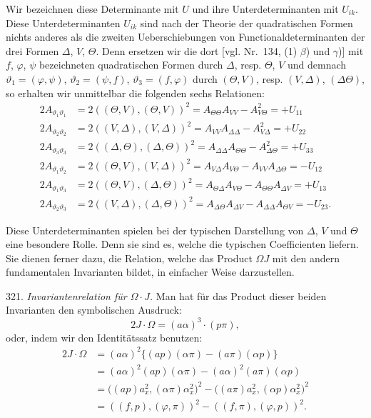 \documentclass[11pt]{article}
\providecommand{\weberpage}[1]{}
\let\Delta\varDelta
\let\Theta\varTheta
\let\Omega\varOmega
\begin{document}
Wir bezeichnen diese Determinante mit $U$ und ihre Unterdeterminanten mit
$U_{ik}$. Diese Unterdeterminanten $U_{ik}$ sind nach der Theorie der
quadratischen Formen nichts anderes als die zweiten Ueberschiebungen von
Functionaldeterminanten der drei Formen $\Delta$, $V$, $\Theta$. Denn
ersetzen wir die dort [vgl. Nr.\ 134, (1) $\beta$) und $\gamma$)] mit
$f$, $\varphi$, $\psi$ bezeichneten quadratischen Formen durch $\Delta$,
resp. $\Theta$, $V$ und demnach $\vartheta_1 = (\varphi,\psi)$,
$\vartheta_2 = (\psi,f)$, $\vartheta_3 = (f,\varphi)$ durch $(\Theta,V)$,
resp. $(V,\Delta)$, $(\Delta\Theta)$, so erhalten wir unmittelbar die
folgenden sechs Relationen:
\[
\begin{aligned}
2A_{\vartheta_1\vartheta_1} &= 2((\Theta,V),(\Theta,V))^2 = A_{\Theta\Theta}A_{VV} - A_{V\Theta}^2 = +U_{11}\\
2A_{\vartheta_2\vartheta_2} &= 2((V,\Delta),(V,\Delta))^2 = A_{VV}A_{\Delta\Delta} - A_{V\Delta}^2 = +U_{22}\\
2A_{\vartheta_3\vartheta_3} &= 2((\Delta,\Theta),(\Delta,\Theta))^2 = A_{\Delta\Delta}A_{\Theta\Theta} - A_{\Delta\Theta}^2 = +U_{33}\\
2A_{\vartheta_1\vartheta_2} &= 2((\Theta,V),(V,\Delta))^2 = A_{V\Delta}A_{V\Theta} - A_{VV}A_{\Delta\Theta} = -U_{12}\\
2A_{\vartheta_1\vartheta_3} &= 2((\Theta,V),(\Delta,\Theta))^2 = A_{\Theta\Delta}A_{V\Theta} - A_{\Theta\Theta}A_{\Delta V} = +U_{13}\\
2A_{\vartheta_2\vartheta_3} &= 2((V,\Delta),(\Delta,\Theta))^2 = A_{\Delta\Theta}A_{\Delta V} - A_{\Delta\Delta}A_{\Theta V} = -U_{23}.
\end{aligned}
\]

Diese Unterdeterminanten spielen bei der typischen Darstellung von
$\Delta$, $V$ und $\Theta$ eine besondere Rolle. Denn sie sind es, welche
die typischen Coefficienten liefern. Sie dienen ferner dazu, die
Relation, welche das Product $\Omega J$ mit den andern fundamentalen
Invarianten bildet, in einfacher Weise darzustellen.


\weberpage{345}

321. \textit{Invariantenrelation für $\Omega\cdot J$.} Man hat für das
Product dieser beiden Invarianten den symbolischen Ausdruck:
\[
2J\cdot\Omega=(a\alpha)^3\cdot(p\pi),
\]
oder, indem wir den Identitätssatz benutzen:
\[
\begin{aligned}
2J\cdot\Omega&=(a\alpha)^2\{(ap)(\alpha\pi)-(a\pi)(\alpha p)\}\\
&=(a\alpha)^2(ap)(\alpha\pi)-(a\alpha)^2(a\pi)(\alpha p)\\
&=\mathbf{(}(ap)a_x^2,(\alpha\pi)\alpha_x^2\mathbf{)}^2-\mathbf{(}(a\pi)a_x^2,(\alpha p)\alpha_x^2\mathbf{)}^2\\
&=((f,p),(\varphi,\pi))^2-((f,\pi),(\varphi,p))^2.
\end{aligned}
\]
\end{document}
